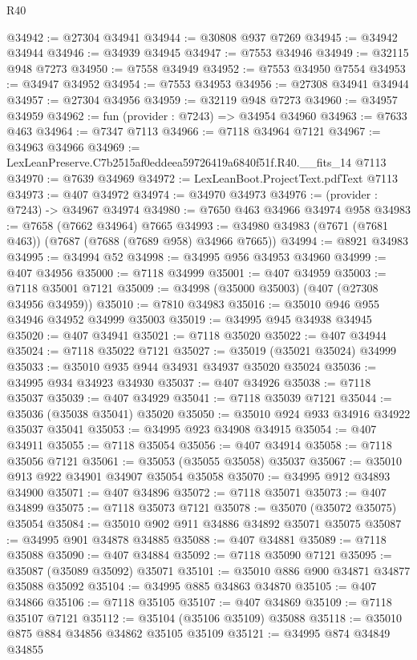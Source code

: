 \begin{lexlean}{R40}
\begin{coremodule}
@34942 := @27304 @34941
@34944 := @30808 @937 @7269
@34945 := @34942 @34944
@34946 := @34939 @34945
@34947 := @7553 @34946
@34949 := @32115 @948 @7273
@34950 := @7558 @34949
@34952 := @7553 @34950 @7554
@34953 := @34947 @34952
@34954 := @7553 @34953
@34956 := @27308 @34941 @34944
@34957 := @27304 @34956
@34959 := @32119 @948 @7273
@34960 := @34957 @34959
@34962 := fun (provider : @7243) => @34954 @34960
@34963 := @7633 @463
@34964 := @7347 @7113
@34966 := @7118 @34964 @7121
@34967 := @34963 @34966
@34969 := LexLeanPreserve.C7b2515af0eddeea59726419a6840f51f.R40.__fits_14 @7113
@34970 := @7639 @34969
@34972 := LexLeanBoot.ProjectText.pdfText @7113
@34973 := @407 @34972
@34974 := @34970 @34973
@34976 := (provider : @7243) -> @34967 @34974
@34980 := @7650 @463 @34966 @34974 @958
@34983 := @7658 (@7662 @34964) @7665
@34993 := @34980 @34983 (@7671 (@7681 @463)) (@7687 (@7688 (@7689 @958) @34966 @7665))
@34994 := @8921 @34983
@34995 := @34994 @52
@34998 := @34995 @956 @34953 @34960
@34999 := @407 @34956
@35000 := @7118 @34999
@35001 := @407 @34959
@35003 := @7118 @35001 @7121
@35009 := @34998 (@35000 @35003) (@407 (@27308 @34956 @34959))
@35010 := @7810 @34983
@35016 := @35010 @946 @955 @34946 @34952 @34999 @35003
@35019 := @34995 @945 @34938 @34945
@35020 := @407 @34941
@35021 := @7118 @35020
@35022 := @407 @34944
@35024 := @7118 @35022 @7121
@35027 := @35019 (@35021 @35024) @34999
@35033 := @35010 @935 @944 @34931 @34937 @35020 @35024
@35036 := @34995 @934 @34923 @34930
@35037 := @407 @34926
@35038 := @7118 @35037
@35039 := @407 @34929
@35041 := @7118 @35039 @7121
@35044 := @35036 (@35038 @35041) @35020
@35050 := @35010 @924 @933 @34916 @34922 @35037 @35041
@35053 := @34995 @923 @34908 @34915
@35054 := @407 @34911
@35055 := @7118 @35054
@35056 := @407 @34914
@35058 := @7118 @35056 @7121
@35061 := @35053 (@35055 @35058) @35037
@35067 := @35010 @913 @922 @34901 @34907 @35054 @35058
@35070 := @34995 @912 @34893 @34900
@35071 := @407 @34896
@35072 := @7118 @35071
@35073 := @407 @34899
@35075 := @7118 @35073 @7121
@35078 := @35070 (@35072 @35075) @35054
@35084 := @35010 @902 @911 @34886 @34892 @35071 @35075
@35087 := @34995 @901 @34878 @34885
@35088 := @407 @34881
@35089 := @7118 @35088
@35090 := @407 @34884
@35092 := @7118 @35090 @7121
@35095 := @35087 (@35089 @35092) @35071
@35101 := @35010 @886 @900 @34871 @34877 @35088 @35092
@35104 := @34995 @885 @34863 @34870
@35105 := @407 @34866
@35106 := @7118 @35105
@35107 := @407 @34869
@35109 := @7118 @35107 @7121
@35112 := @35104 (@35106 @35109) @35088
@35118 := @35010 @875 @884 @34856 @34862 @35105 @35109
@35121 := @34995 @874 @34849 @34855

\end{coremodule}
\end{lexlean}
